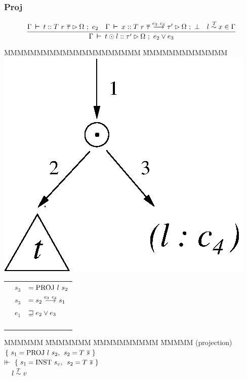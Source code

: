 \vspace{-2em}
\subsubsection{Proj}

$$
\begin{aligned}
	\frac
	{ \Gamma \hspace{2pt} \boldsymbol{\vdash} \hspace{2pt} t :: T \ r \ \overline{\tau} \rhd \Omega \ ; \ e_2 \quad
	  \Gamma \hspace{2pt} \boldsymbol{\vdash} \hspace{2pt} x :: T \ r \ \overline{\tau} \stackrel{e_3 \ c_4}{\longrightarrow} \tau' \rhd \Omega \ ; \ \bot \quad
	  l \stackrel{\:T}{\sim} x \in \Gamma
	}
	{ \Gamma \hspace{2pt} \boldsymbol{\vdash} \hspace{2pt} t \odot l :: \tau' \rhd \Omega \ ; \ e_2 \lor e_3 }
\end{aligned}
$$

\begin{tabbing}
	MMMMMMMMMMMMMMMMMMMMM \= MMMMMMMMMMMMM \kill
	\hspace{12ex} 
	\includegraphics[scale=0.5]{3-Inference/fig/constraints/proj.eps} 
	\> 
	\begin{tabular}{lll}
		& $s_3$ 	& $= \rPROJ \ l \ s_2$ \\
		& $s_3$		& $= s_2 \stackrel{e_3 \ c_4}{\longrightarrow} s_1$ \\
		& $e_1$		& $\sqsupseteq e_2 \lor e_3$ \\
		\\ \\ \\ \\
	\end{tabular}
\end{tabbing}

\vspace{-4em}
\begin{tabbing}
MMMMMM \= MMMMMMM \= MMMMMMMMMM \= MMMMM \kill
	\> (projection)	 \> $\{ \ s_1 = \textrm{PROJ} \ l \ s_2,$ \> $s_2 = T \ \ov{s} \ \}$ \\
	\> \qq $\vdash\mkern-6mu\vdash$ \> $\{ \ s_1 = \textrm{INST} \ s_v,$	  \> $s_2 = T \ \ov{s} \ \}$
	\\[1ex]
	\> \>  \ \ $l \stackrel{T}{\sim} v$
\end{tabbing}



